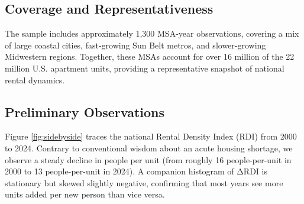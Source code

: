 \documentclass[APA,Times1COL]{WileyNJDv5} %
\begin{document}
\subsection{Coverage and Representativeness}
The sample includes approximately 1,300 MSA-year observations, covering a mix of large coastal cities, fast-growing Sun Belt metros, and slower-growing Midwestern regions. Together, these MSAs account for over 16 million of the 22 million U.S. apartment units, providing a representative snapshot of national rental dynamics. 

\subsection{Preliminary Observations}

Figure \ref{fig:sidebyside} traces the national Rental Density Index (RDI) from 2000 to 2024. Contrary to conventional wisdom about an acute housing shortage, we observe a steady decline in people per unit (from roughly 16 people-per-unit in 2000 to 13 people-per-unit in 2024). A companion histogram of ΔRDI is stationary but skewed slightly negative, confirming that most years see more units added per new person than vice versa.
\end{document}
